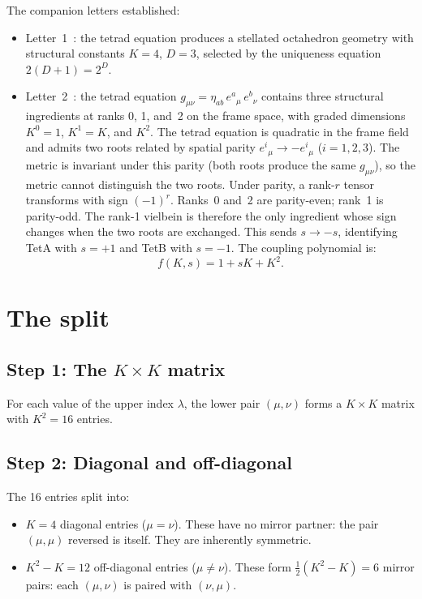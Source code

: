 \documentclass[11pt]{article}
\begin{document}
The companion letters established:
\begin{itemize}
  \item Letter~1~\cite{Nelson2026a}: the tetrad equation produces
    a stellated octahedron geometry with structural constants
    $K = 4$, $D = 3$, selected by the uniqueness equation
    $2(D{+}1) = 2^D$.
  \item Letter~2~\cite{Nelson2026b}: the tetrad equation
    $g_{\mu\nu} = \eta_{ab}\,e^a{}_\mu\,e^b{}_\nu$ contains
    three structural ingredients at ranks 0, 1, and~2 on the
    frame space, with graded dimensions $K^0 = 1$, $K^1 = K$,
    and $K^2$.  The tetrad equation is quadratic in the frame
    field and admits two roots related by spatial parity
    $e^i{}_\mu \to -e^i{}_\mu$ ($i = 1,2,3$).  The metric is invariant under
    this parity (both roots produce the same $g_{\mu\nu}$), so
    the metric cannot distinguish the two roots.  Under parity,
    a rank-$r$ tensor transforms with sign $(-1)^r$.  Ranks~0
    and~2 are parity-even; rank~1 is parity-odd.  The rank-1
    vielbein is therefore the only ingredient whose sign
    changes when the two roots are exchanged.  This sends
    $s \to -s$, identifying TetA with $s = +1$ and TetB with
    $s = -1$.  The coupling polynomial is:
    \begin{equation}
      f(K,s) = 1 + sK + K^2.
      \label{eq:poly}
    \end{equation}
\end{itemize}

\section{The split}

\subsection*{Step 1: The $K \times K$ matrix}

For each value of the upper index $\lambda$, the lower pair
$(\mu, \nu)$ forms a $K \times K$ matrix with $K^2 = 16$
entries.

\subsection*{Step 2: Diagonal and off-diagonal}

The 16 entries split into:
\begin{itemize}
  \item $K = 4$ diagonal entries ($\mu = \nu$).  These have no
    mirror partner: the pair $(\mu, \mu)$ reversed is itself.
    They are inherently symmetric.
  \item $K^2 - K = 12$ off-diagonal entries ($\mu \neq \nu$).
    These form $\tfrac{1}{2}(K^2 - K) = 6$ mirror pairs:
    each $(\mu, \nu)$ is paired with $(\nu, \mu)$.
\end{itemize}
\end{document}
